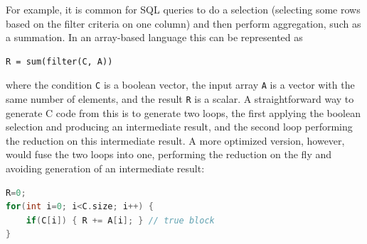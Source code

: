 For example, it is common for SQL queries to do a selection (selecting some
rows based on the filter criteria on one column) and then perform aggregation,
such as a summation.  In an array-based language this can be represented as

\begin{small}
\begin{Verbatim}[xleftmargin=.3\columnwidth]
R = sum(filter(C, A))
\end{Verbatim}
\end{small}


\noindent{}where the condition \texttt{C} is a boolean vector, the input array \texttt{A}
is a vector with the same number of elements, and the result \texttt{R} is a
scalar.  A straightforward way to generate C code from this is to generate two loops, the first applying the boolean selection and producing an intermediate result, and the second loop performing the reduction on this intermediate result.  A more optimized version, however, would fuse the two loops into one, performing the reduction on the fly and avoiding generation of an intermediate result:

\begin{center}
\begin{minipage}{\linewidth}
\begin{small}
\begin{lstlisting}[language=C, frame=single, xleftmargin=0mm, xrightmargin=5mm]
R=0;
for(int i=0; i<C.size; i++) {
    if(C[i]) { R += A[i]; } // true block
}
\end{lstlisting}
\end{small}
\end{minipage}
\end{center}



